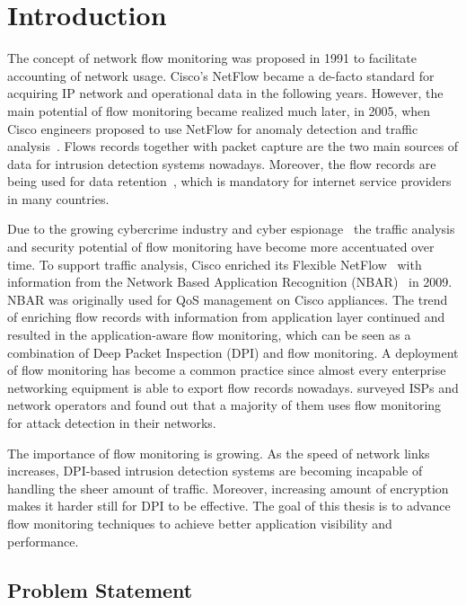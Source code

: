 \chapter{Introduction}

The concept of network flow monitoring was proposed in 1991 to facilitate accounting of network usage. Cisco's NetFlow became a de-facto standard for acquiring IP network and operational data in the following years. However, the main potential of flow monitoring became realized much later, in 2005, when Cisco engineers proposed to use NetFlow for anomaly detection and traffic analysis~\cite{CiscoSystems-2005-Cisco}. Flows records together with packet capture are the two main sources of data for intrusion detection systems nowadays. Moreover, the flow records are being used for data retention~\cite{Wanrooij-2005-Data}, which is mandatory for internet service providers in many countries. 

Due to the growing cybercrime industry and cyber espionage~\cite{CSIS-2013-Economic} the traffic analysis and security potential of flow monitoring have become more accentuated over time. To support traffic analysis, Cisco enriched its Flexible NetFlow~\cite{CiscoSystems-2008-Cisco} with information from the Network Based Application Recognition (NBAR)~\cite{CiscoSystems--Network} in 2009. NBAR was originally used for QoS management on Cisco appliances. The trend of enriching flow records with information from application layer continued and resulted in the application-aware flow monitoring, which can be seen as a combination of Deep Packet Inspection (DPI) and flow monitoring. A deployment of flow monitoring has become a common practice since almost every enterprise networking equipment is able to export flow records nowadays. \citeauthor{Steinberger-2013-Anomaly} surveyed ISPs and network operators and found out that a majority of them uses flow monitoring for attack detection in their networks.

The importance of flow monitoring is growing. As the speed of network links increases, DPI-based intrusion detection systems are becoming incapable of handling the sheer amount of traffic. Moreover, increasing amount of encryption makes it harder still for DPI to be effective. The goal of this thesis is to advance flow monitoring techniques to achieve better application visibility and performance.

\section{Problem Statement}


